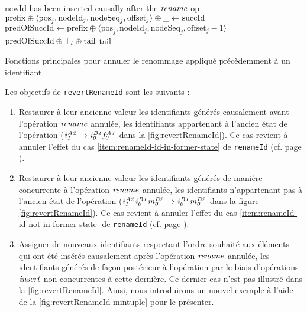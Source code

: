 \begin{algorithm}[!ht]
\begin{algorithmic}[1]
            \Statex \Comment newId has been inserted causally after the $\mathit{rename}$ op
            \State $\text{prefix} \oplus \langle \text{pos}_{j},\text{nodeId}_{j},\text{nodeSeq}_{j},\text{offset}_{j} \rangle \oplus \_ \leftarrow \text{succId}$
            \State $\text{predOfSuccId} \gets \text{prefix} \oplus \langle \text{pos}_j,\text{nodeId}_j,\text{nodeSeq}_j,\text{offset}_{j} - 1 \rangle$
            \State \Return $\text{predOfSuccId} \oplus \top_t \oplus \text{tail}$ \Comment \commenttopt
            \label{alg:revertRenameId-case-iii-max-tuple}
        \Else
            \State \Return tail \label{alg:revertRenameId-case-ii}
        \EndIf
    \EndFunction
  \end{algorithmic}
  \caption{Fonctions principales pour annuler le renommage appliqué précèdemment à un identifiant}
  \label{alg:revertRenameId}
\end{algorithm}

Les objectifs de \texttt{revertRenameId} sont les suivants :
\begin{enumerate}
  \item \label{item:revert-rename-1}
    Restaurer à leur ancienne valeur les identifiants générés causalement avant l'opération $\mathit{rename}$ annulée, \ie les identifiants appartenant à l'ancien état de l'opération (\eg $\mathit{i}^{\mathit{A2}}_{\mathit{1}} \rightarrow \mathit{i}^{\mathit{B1}}_{\mathit{0}}\mathit{f}^{\mathit{A1}}_{\mathit{0}}$ dans la \autoref{fig:revertRenameId}).
    Ce cas revient à annuler l'effet du cas \ref{item:renameId-id-in-former-state} de \texttt{renameId} (cf. page \pageref{item:renameId-id-in-former-state}).
  \item \label{item:revert-rename-2}
    Restaurer à leur ancienne valeur les identifiants générés de manière concurrente à l'opération $\mathit{rename}$ annulée, \ie les identifiants n'appartenant pas à l'ancien état de l'opération (\eg $\mathit{i}^{\mathit{A2}}_{\mathit{1}}\mathit{i}^{\mathit{B1}}_{\mathit{0}}\mathit{m}^{\mathit{B2}}_{\mathit{0}} \rightarrow \mathit{i}^{\mathit{B1}}_{\mathit{0}}\mathit{m}^{\mathit{B2}}_{\mathit{0}}$ dans la figure \autoref{fig:revertRenameId}).
    Ce cas revient à annuler l'effet du cas \ref{item:renameId-id-not-in-former-state} de \texttt{renameId} (cf. page \pageref{item:renameId-id-in-former-state}).
  \item \label{item:revert-rename-3}
    Assigner de nouveaux identifiants respectant l'ordre souhaité aux éléments qui ont été insérés causalement après l'opération $\mathit{rename}$ annulée, \ie les identifiants générés de façon postérieur à l'opération par le biais d'opérations $\mathit{insert}$ non-concurrentes à cette dernière.
    Ce dernier cas n'est pas illustré dans la \autoref{fig:revertRenameId}.
    Ainsi, nous introduirons un nouvel exemple à l'aide de la \autoref{fig:revertRenameId-mintuple} pour le présenter.
\end{enumerate}

